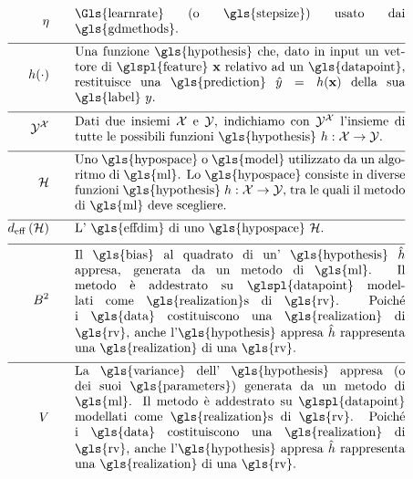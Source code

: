 \begin{align}
\lrate  \quad\quad & \parbox{.75\textwidth}{\Gls{learnrate} (o \gls{stepsize}) usato dai \gls{gdmethods}.}  \nonumber \\[2mm] \hline \nonumber\\[-5mm]
	\hypothesis(\cdot)  \quad\quad &\parbox{.75\textwidth}{Una funzione \gls{hypothesis} che, dato in input un vettore di \glspl{feature} $\featurevec$ relativo ad un \gls{datapoint}, restituisce una \gls{prediction} $\hat{\truelabel}=\hypothesis(\featurevec)$ della sua \gls{label} $\truelabel$.}  	 \nonumber \\[2mm] \hline \nonumber\\[-5mm]
	 \labelspace^{\featurespace} \quad\quad & \parbox{.75\textwidth}{Dati due insiemi $\featurespace$ e $\labelspace$, indichiamo con $ \labelspace^{\featurespace}$ l'insieme di tutte le possibili funzioni \gls{hypothesis} $\hypothesis: \featurespace \rightarrow \labelspace$.} 	 \nonumber \\[2mm] \hline \nonumber\\[-5mm]
	\hypospace  \quad\quad & \parbox{.75\textwidth}{Uno \gls{hypospace} o \gls{model} utilizzato da un algoritmo di \gls{ml}. 
		Lo \gls{hypospace} consiste in diverse funzioni \gls{hypothesis} $\hypothesis: \featurespace \rightarrow \labelspace$, tra le quali il metodo di \gls{ml} deve scegliere.}   \nonumber \\[2mm] \hline \nonumber\\[-5mm]
	\effdim{\hypospace}  \quad\quad & \parbox{.75\textwidth}{L' \gls{effdim} di uno \gls{hypospace} $\hypospace$.}   \nonumber \\[2mm] \hline \nonumber\\[-5mm]
	\biasterm^2 \quad\quad &\parbox{.75\textwidth}{
		Il \gls{bias} al quadrato di un' \gls{hypothesis} $\learnthypothesis$ 
		appresa, generata da un metodo di \gls{ml}. Il metodo è addestrato su \glspl{datapoint} 
		modellati come \gls{realization}s di \gls{rv}. Poiché i \gls{data} costituiscono una \gls{realization} 
		di \gls{rv}, anche l'\gls{hypothesis} appresa $\learnthypothesis$ rappresenta una \gls{realization} 
		di una \gls{rv}.} \nonumber  \nonumber \\[2mm] \hline \nonumber\\[-5mm]
	\varianceterm \quad\quad &\parbox{.75\textwidth}{La \gls{variance} dell' 
		\gls{hypothesis} appresa (o dei suoi \gls{parameters}) generata da un metodo di \gls{ml}. 
		Il metodo è addestrato su \glspl{datapoint} 
		modellati come \gls{realization}s di \gls{rv}. Poiché i \gls{data} costituiscono una \gls{realization} 
		di \gls{rv}, anche l'\gls{hypothesis} appresa $\learnthypothesis$ rappresenta una \gls{realization} 
		di una \gls{rv}.} \nonumber \nonumber %
\end{align}     

